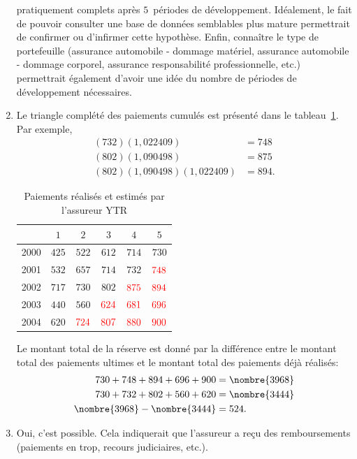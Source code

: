 \begin{exercice}
\begin{sol}
\begin{enumerate}
      pratiquement complets après $5$~périodes de développement.
      Idéalement, le fait de pouvoir consulter une base de données
      semblables plus mature permettrait de confirmer ou d'infirmer
      cette hypothèse. Enfin, connaître le type de portefeuille
      (assurance automobile - dommage matériel, assurance automobile -
      dommage corporel, assurance responsabilité professionnelle,
      etc.) permettrait également d'avoir une idée du nombre de
      périodes de développement nécessaires.
    \item Le triangle complété des paiements cumulés est présenté dans
      le tableau~\ref{tab:tri3}. Par exemple,
      \begin{align*}
        (732)(1,022409) &= 748\\
        (802)(1,090498) &= 875\\
        (802)(1,090498)(1,022409) &= 894.
      \end{align*}
      \begin{table}[!h]
        \centering
        \begin{tabular}{cccccc}
          \toprule
          & $1$ & $2$ & $3$ & $4$ & $5$\\
          \midrule
          2000 & $425$ & $522$ & $612$ & $714$ & $730$\\
          2001 & $532$ & $657$ & $714$ & $732$ & $\textcolor{red}{748}$\\
          2002 & $717$ & $730$ & $802$ & $\textcolor{red}{875}$ & $\textcolor{red}{894}$\\
          2003 & $440$ & $560$ & $\textcolor{red}{624}$ & $\textcolor{red}{681}$ & $\textcolor{red}{696}$\\
          2004 & $620$ & $\textcolor{red}{724}$ & $\textcolor{red}{807}$ & $\textcolor{red}{880}$ & $\textcolor{red}{900}$\\
          \bottomrule
        \end{tabular}
        \caption{Paiements réalisés et estimés par l'assureur YTR}
        \label{tab:tri3}
      \end{table}
      Le montant total de la réserve est donné par la différence entre
      le montant total des paiements ultimes et le montant total des
      paiements déjà réalisés:
      \begin{align*}
        730 + 748 + 894 + 696 + 900 &= \nombre{3968}\\
        730 + 732 + 802 + 560 + 620 &= \nombre{3444}\\
        \nombre{3968} - \nombre{3444} &= 524.
      \end{align*}
    \item Oui, c'est possible. Cela indiquerait que l'assureur a reçu
      des remboursements (paiements en trop, recours judiciaires,
      etc.).
    \end{enumerate}
  \end{sol}
\end{exercice}

